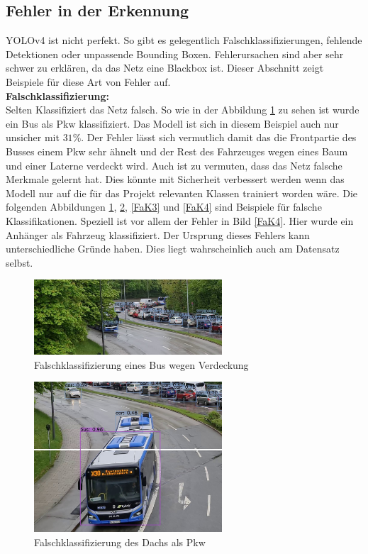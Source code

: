 \documentclass[conference]{IEEEtran}
\begin{document}
	\subsection{Fehler in der Erkennung}
	YOLOv4 ist nicht perfekt. So gibt es gelegentlich Falschklassifizierungen, fehlende Detektionen oder unpassende Bounding Boxen.  Fehlerursachen sind aber sehr schwer zu erklären, da das Netz eine Blackbox ist. Dieser Abschnitt zeigt Beispiele für diese Art von Fehler auf.\\
	\textbf{Falschklassifizierung:}\\
	Selten Klassifiziert das Netz falsch. So wie in der Abbildung \ref{FaK} zu sehen ist wurde ein Bus als Pkw klassifiziert. Das Modell ist sich in diesem Beispiel auch nur unsicher mit $31\%$. Der Fehler lässt sich vermutlich damit das die Frontpartie des Busses einem Pkw sehr ähnelt und der Rest des Fahrzeuges wegen eines Baum und einer Laterne verdeckt wird. Auch ist zu vermuten, dass das Netz falsche Merkmale gelernt hat. Dies könnte mit Sicherheit verbessert werden wenn das Modell nur auf die für das Projekt relevanten Klassen trainiert worden wäre. Die folgenden Abbildungen \ref{FaK}, \ref{FaK2}, \ref{FaK3} und \ref{FaK4} sind Beispiele für falsche Klassifikationen. Speziell ist vor allem der Fehler in Bild \ref{FaK4}. Hier wurde ein Anhänger als Fahrzeug klassifiziert. Der Ursprung dieses Fehlers kann unterschiedliche Gründe haben. Dies liegt wahrscheinlich auch am Datensatz selbst.
	\begin{figure}[!h]
		\begin{center}
			\includegraphics[width=7cm]{Media/Output_480 - Kopie.jpg}
			\caption{Falschklassifizierung eines Bus wegen Verdeckung}
			\label{FaK}
		\end{center}
	\end{figure}
	\begin{figure}[!h]
		\begin{center}
			\includegraphics[width=7cm]{Media/Output_847 - Kopie.jpg}
			\caption{Falschklassifizierung des Dachs als Pkw}
			\label{FaK2}
		\end{center}
	\end{figure}
\end{document}
